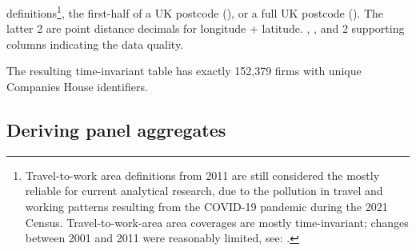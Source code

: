 definitions\footnote{Travel-to-work area definitions from 2011 are still considered
the mostly reliable for current analytical research,
due to the pollution in travel and working patterns resulting from the COVID-19 pandemic during the 2021 Census.
Travel-to-work-area area coverages are mostly time-invariant; changes between 2001 and 2011
were reasonably limited, see: \cite{ons2015:ttwa}.},
the first-half of a UK postcode (), or a full UK postcode ().
The latter 2 are point distance decimals for longitude + latitude.
, ,
and 2 supporting columns indicating the data quality.
\par
The resulting time-invariant table has exactly 152,379 firms
with unique Companies House  identifiers.

\subsection{Deriving panel aggregates}
\label{ss:data-panel-aggregates}

